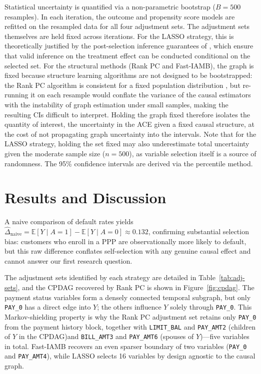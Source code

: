 \documentclass[11pt, a4paper]{article}
\theoremstyle{definition}
\begin{document}
Statistical uncertainty is quantified via a non-parametric bootstrap ($B = 500$ resamples).
In each iteration, the outcome and propensity score models are refitted on the resampled
data for all four adjustment sets. The adjustment sets themselves are held fixed across
iterations. For the LASSO strategy, this is theoretically justified by the post-selection
inference guarantees of \cite{belloni2014inference}, which ensure that valid inference on
the treatment effect can be conducted conditional on the selected set. For the structural
methods (Rank PC and Fast-IAMB), the graph is fixed because structure learning algorithms
are not designed to be bootstrapped: the Rank PC algorithm is consistent for a fixed
population distribution \cite{harris2013pc}, but re-running it on each resample would
conflate the variance of the causal estimators with the instability of graph estimation
under small samples, making the resulting CIs difficult to interpret. Holding the graph
fixed therefore isolates the quantity of interest, the uncertainty in the ACE given a
fixed causal structure, at the cost of not propagating graph uncertainty into the
intervals. Note that for the LASSO strategy, holding the set fixed may also underestimate
total uncertainty given the moderate sample size ($n = 500$), as variable selection itself
is a source of randomness. The 95\% confidence intervals are derived via the percentile
method.

\section{Results and Discussion}

A naive comparison of default rates yields
$\hat{\Delta}_{\text{naive}} = \mathbb{E}[Y \mid A=1] - \mathbb{E}[Y \mid A=0] \approx 0.132$,
confirming substantial selection bias: customers who enroll in a PPP are observationally
more likely to default, but this raw difference conflates self-selection with any genuine
causal effect and cannot answer our first research question.

The adjustment sets identified by each strategy are detailed in Table~\ref{tab:adj-sets},
and the CPDAG recovered by Rank PC is shown in Figure~\ref{fig:cpdag}. The payment status
variables form a densely connected temporal subgraph, but only \texttt{PAY\_0} has a direct
edge into $Y$; the others influence $Y$ solely through \texttt{PAY\_0}. This
Markov-shielding property is why the Rank PC adjustment set retains only \texttt{PAY\_0}
from the payment history block, together with \texttt{LIMIT\_BAL} and \texttt{PAY\_AMT2}
(children of $Y$ in the CPDAG)and \texttt{BILL\_AMT3} and \texttt{PAY\_AMT6} (spouses of $Y$)---five variables in total. Fast-IAMB recovers an even sparser boundary of two variables (\texttt{PAY\_0} and
\texttt{PAY\_AMT4}), while LASSO selects 16 variables by design agnostic to the causal graph.
\end{document}
